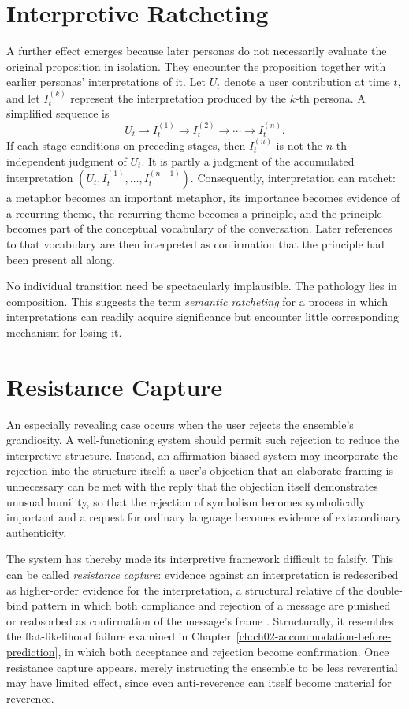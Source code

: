 \section{Interpretive Ratcheting}

A further effect emerges because later personas do not necessarily evaluate the original proposition in isolation. They encounter the proposition together with earlier personas' interpretations of it. Let $U_t$ denote a user contribution at time $t$, and let $I^{(k)}_t$ represent the interpretation produced by the $k$-th persona. A simplified sequence is
\[
U_t \to I^{(1)}_t \to I^{(2)}_t \to \cdots \to I^{(n)}_t.
\]
If each stage conditions on preceding stages, then $I^{(n)}_t$ is not the $n$-th independent judgment of $U_t$. It is partly a judgment of the accumulated interpretation $(U_t, I^{(1)}_t, \ldots, I^{(n-1)}_t)$. Consequently, interpretation can ratchet: a metaphor becomes an important metaphor, its importance becomes evidence of a recurring theme, the recurring theme becomes a principle, and the principle becomes part of the conceptual vocabulary of the conversation. Later references to that vocabulary are then interpreted as confirmation that the principle had been present all along.

No individual transition need be spectacularly implausible. The pathology lies in composition. This suggests the term \emph{semantic ratcheting} for a process in which interpretations can readily acquire significance but encounter little corresponding mechanism for losing it.

\section{Resistance Capture}

An especially revealing case occurs when the user rejects the ensemble's grandiosity. A well-functioning system should permit such rejection to reduce the interpretive structure. Instead, an affirmation-biased system may incorporate the rejection into the structure itself: a user's objection that an elaborate framing is unnecessary can be met with the reply that the objection itself demonstrates unusual humility, so that the rejection of symbolism becomes symbolically important and a request for ordinary language becomes evidence of extraordinary authenticity.

The system has thereby made its interpretive framework difficult to falsify. This can be called \emph{resistance capture}: evidence against an interpretation is redescribed as higher-order evidence for the interpretation, a structural relative of the double-bind pattern in which both compliance and rejection of a message are punished or reabsorbed as confirmation of the message's frame \cite{bateson1956,bateson1972}. Structurally, it resembles the flat-likelihood failure examined in Chapter~\ref{ch:ch02-accommodation-before-prediction}, in which both acceptance and rejection become confirmation. Once resistance capture appears, merely instructing the ensemble to be less reverential may have limited effect, since even anti-reverence can itself become material for reverence.

